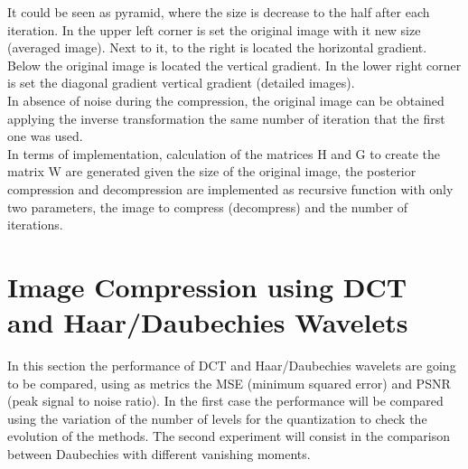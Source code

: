 \documentclass[a4paper, 10pt, conference] {article}
\begin{document}
 It could be seen as pyramid, where the size is decrease to the half after each iteration. In the upper left corner is set the original image with it new size (averaged image). Next to it, to the right is located the horizontal gradient. Below the original image is located the vertical gradient. In the lower right corner is set the diagonal gradient vertical gradient (detailed images). \\
 
 In absence of noise during the compression, the original image can be obtained applying the inverse transformation the same number of iteration that the first one was used.\\
 
 In terms of implementation, calculation of the matrices H and G to create the matrix W are generated given the size of the original image, the posterior compression and decompression are implemented as recursive function with only two parameters, the image to compress (decompress) and the number of iterations.
 
 \section{Image Compression using DCT and Haar/Daubechies Wavelets}
 In this section the performance of DCT and Haar/Daubechies wavelets are going to be compared, using as metrics the MSE (minimum squared error) and PSNR (peak signal to noise ratio). In the first case the performance will be compared using the variation of the number of levels for the quantization to check the evolution of the methods.
 The second experiment will consist in the comparison between Daubechies with different vanishing moments.
 
\end{document}
